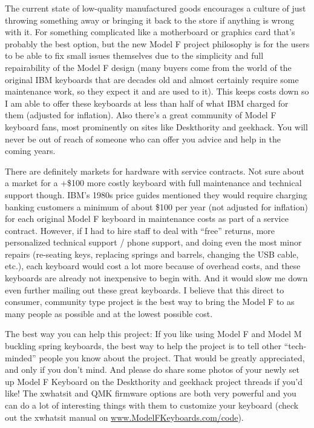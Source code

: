 \documentclass[a5paper, twoside]{memoir}
\begin{document}
    The current state of low-quality manufactured goods encourages a culture of just throwing something away or bringing it back to the store if anything is wrong with it.  For something complicated like a motherboard or graphics card that’s probably the best option, but the new Model F project philosophy is for the users to be able to fix small issues themselves due to the simplicity and full repairability of the Model F design (many buyers come from the world of the original IBM keyboards that are decades old and almost certainly require some maintenance work, so they expect it and are used to it). This keeps costs down so I am able to offer these keyboards at less than half of what IBM charged for them (adjusted for inflation). Also there’s a great community of Model F keyboard fans, most prominently on sites like Deskthority and geekhack. You will never be out of reach of someone who can offer you advice and help in the coming years.

    There are definitely markets for hardware with service contracts. Not sure about a market for a +\$100 more costly keyboard with full maintenance and technical support though. IBM’s 1980s price guides mentioned they would require charging banking customers a minimum of about \$100 per year (not adjusted for inflation) for each original Model F keyboard in maintenance costs as part of a service contract. However, if I had to hire staff to deal with ``free'' returns, more personalized technical support / phone support, and doing even the most minor repairs (re-seating keys, replacing springs and barrels, changing the USB cable, etc.), each keyboard would cost a lot more because of overhead costs, and these keyboards are already not inexpensive to begin with. And it would slow me down even further mailing out these great keyboards. I believe that this direct to consumer, community type project is the best way to bring the Model F to as many people as possible and at the lowest possible cost.

    The best way you can help this project:  If you like using Model F and Model M buckling spring keyboards, the best way to help the project is to tell other ``tech-minded'' people you know about the project. That would be greatly appreciated, and only if you don’t mind. And please do share some photos of your newly set up Model F Keyboard on the Deskthority and geekhack project threads if you’d like!  The xwhatsit and QMK firmware options are both very powerful and you can do a lot of interesting things with them to customize your keyboard (check out the xwhatsit manual on \url{www.ModelFKeyboards.com/code}).
    
\end{document}
